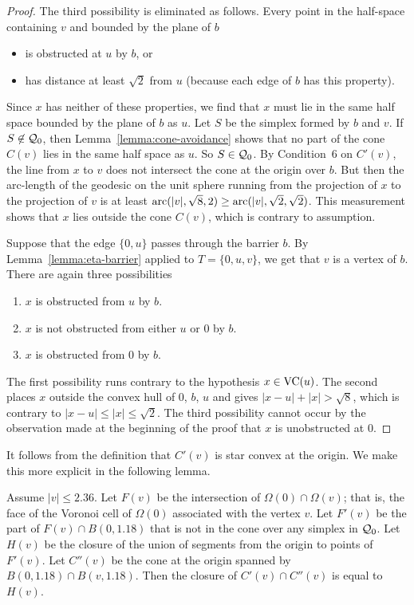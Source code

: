 \begin{proof}
The third possibility is eliminated as follows.
Every point in the half-space containing $v$ and bounded by the plane
of $b$
 \begin{itemize}
 \item is obstructed at $u$ by $b$, or
 \item has distance at least $\sqrt2$ from $u$ (because each edge of
 $b$ has this property).
 \end{itemize}
Since $x$ has neither of these properties, we find that $x$
 must
lie in the same half space bounded by the plane of $b$ as $u$. Let
$S$ be the simplex formed by $b$ and $v$.  If $S\not\in {\mathcal Q}_0$,
then Lemma~\ref{lemma:cone-avoidance} shows that no part of the
cone $C(v)$ lies in the same half space as $u$.  So $S\in
{\mathcal Q}_0$.  By Condition~6 on $C'(v)$, the line from $x$ to $v$
does not intersect the cone at the origin over $b$.  But then the
arc-length of the geodesic on the unit sphere running from the
projection of $x$ to the projection of $v$ is at least
${\operatorname{arc}}(|v|,\sqrt8,2)\ge {\operatorname{arc}}(|v|,\sqrt2,\sqrt2)$. This
measurement shows that $x$ lies outside the cone $C(v)$, which is
contrary to assumption.

Suppose that the edge $\{0,u\}$ passes through the barrier $b$. By
Lemma~\ref{lemma:eta-barrier} applied to $T=\{0,u,v\}$, we get
that $v$ is a vertex of $b$.   There are again three possibilities
   \begin{enumerate}
   \item $x$ is obstructed from $u$ by $b$.
   \item $x$ is not obstructed from either $u$ or $0$ by $b$.
   \item $x$ is obstructed from $0$ by $b$.
   \end{enumerate}
The first possibility runs contrary to the hypothesis $x\in
{\operatorname{VC}}(u)$.  The second places $x$ outside the convex hull of
$0$, $b$, $u$ and gives $|x-u|+|x|>\sqrt8$, which is contrary to
$|x-u|\le|x|\le\sqrt2$. The third possibility cannot occur by the
observation made at the beginning of the proof that $x$ is
unobstructed at $0$.
\end{proof}

It follows from the definition that $C'(v)$ is star convex at the
origin. We make this more explicit in the following lemma.

\begin{lemma}\label{lemma:F'}
Assume $|v|\le 2.36$.  Let $F(v)$ be the intersection of
$\Omega(0)\cap\Omega(v)$; that is, the face of the Voronoi cell of
$\Omega(0)$ associated with the vertex $v$.  Let $F'(v)$ be the
part of $F(v)\cap B(0,1.18)$ that is not in the cone over any
simplex in ${\mathcal Q}_0$. Let $H(v)$ be the closure
of the union of segments from
the origin to points of $F'(v)$.
Let $C''(v)$ be the cone at the origin spanned
by $B(0,1.18)\cap B(v,1.18)$. Then the closure of $C'(v)\cap C''(v)$
is equal to  $H(v)$.
\end{lemma}


